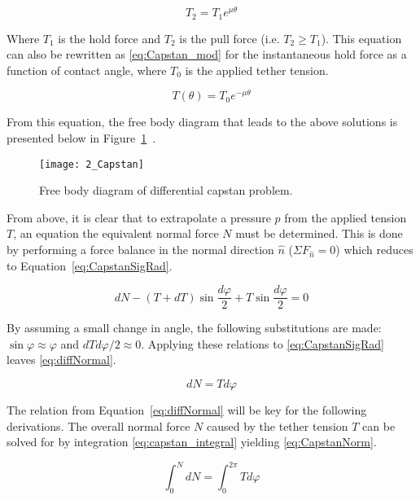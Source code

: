 \begin{equation}
	\label{eq:Capstan}
	T_2 = T_1 e^{\mu\theta}
\end{equation}

Where $T_1$ is the hold force and $T_2$ is the pull force (i.e. $T_2 \geq T_1$). This equation can also be rewritten as \ref{eq:Capstan_mod} for the instantaneous hold force as a function of contact angle, where $T_0$ is the applied tether tension. 

\begin{equation}
	\label{eq:Capstan_mod}
	T(\theta) = T_0 e^{-\mu\theta}
\end{equation}

From this equation, the free body diagram that leads to the above solutions is presented below in Figure~\ref{fig:Capstan}~\cite{capstanman}. 

\begin{figure}[H]
	\centering
	\texttt{[image: 2\_Capstan]}
	\caption[Free body diagram of differential capstan problem.]{Free body diagram of differential capstan problem. \protect\cite{capstanman}}
	\label{fig:Capstan}
\end{figure}

From above, it is clear that to extrapolate a pressure $p$ from the applied tension $T$, an equation the equivalent normal force $N$ must be determined. This is done by performing a force balance in the normal direction $\hat{n}$ ($\Sigma F_{\hat{n}} = 0 $) which reduces to Equation~\ref{eq:CapstanSigRad}.

\begin{equation}
	\label{eq:CapstanSigRad}
	dN-(T+dT)\sin \frac{d\varphi}{2}+T\sin \frac{d\varphi}{2}= 0
\end{equation}

By assuming a small change in angle, the following substitutions are made: $\sin \varphi \approx \varphi$ and $dT d\varphi/2 \approx 0$. Applying these relations to \ref{eq:CapstanSigRad} leaves \ref{eq:diffNormal}.

\begin{equation}
	\label{eq:diffNormal}
	dN = T d\varphi
\end{equation}

The relation from Equation~\ref{eq:diffNormal} will be key for the following derivations. The overall normal force $N$ caused by the tether tension $T$ can be solved for by integration \ref{eq:capstan_integral} yielding \ref{eq:CapstanNorm}.

\begin{equation}
	\label{eq:capstan_integral}
	\int_0^N dN =\int_0^{2\pi} T d\varphi
\end{equation}

